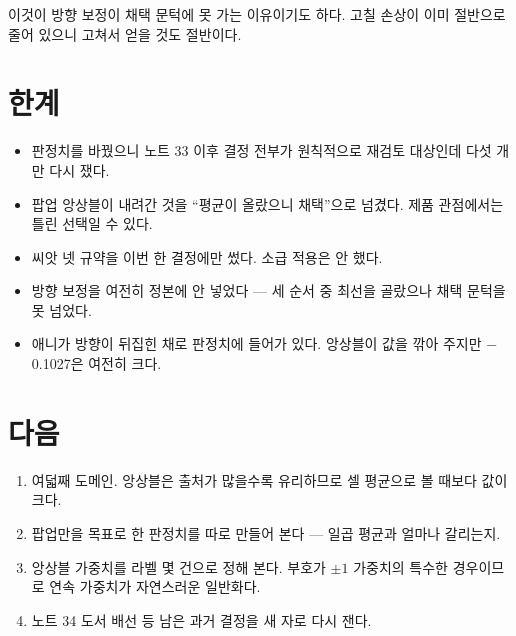 \documentclass[10pt]{article}
\begin{document}

이것이 방향 보정이 채택 문턱에 못 가는 이유이기도 하다. 고칠 손상이 이미 절반으로
줄어 있으니 고쳐서 얻을 것도 절반이다.

\section{한계}

\begin{itemize}[leftmargin=1.1em,itemsep=0.15em]
\item 판정치를 바꿨으니 노트 33 이후 결정 전부가 원칙적으로 재검토 대상인데
      다섯 개만 다시 쟀다.
\item 팝업 앙상블이 내려간 것을 ``평균이 올랐으니 채택''으로 넘겼다. 제품
      관점에서는 틀린 선택일 수 있다.
\item 씨앗 넷 규약을 이번 한 결정에만 썼다. 소급 적용은 안 했다.
\item 방향 보정을 여전히 정본에 안 넣었다 --- 세 순서 중 최선을 골랐으나 채택
      문턱을 못 넘었다.
\item 애니가 방향이 뒤집힌 채로 판정치에 들어가 있다. 앙상블이 값을 깎아 주지만
      $-$0.1027은 여전히 크다.
\end{itemize}

\section{다음}

\begin{enumerate}[leftmargin=1.3em,itemsep=0.15em]
\item 여덟째 도메인. 앙상블은 출처가 많을수록 유리하므로 셀 평균으로 볼 때보다
      값이 크다.
\item 팝업만을 목표로 한 판정치를 따로 만들어 본다 --- 일곱 평균과 얼마나
      갈리는지.
\item 앙상블 가중치를 라벨 몇 건으로 정해 본다. 부호가 $\pm1$ 가중치의 특수한
      경우이므로 연속 가중치가 자연스러운 일반화다.
\item 노트 34 도서 배선 등 남은 과거 결정을 새 자로 다시 잰다.
\end{enumerate}
\end{document}
